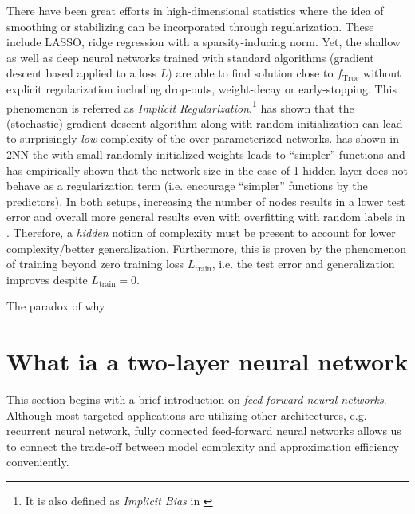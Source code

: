 There have been great efforts in high-dimensional statistics where the idea
of smoothing or stabilizing can be incorporated through regularization. These
include LASSO, ridge regression with a sparsity-inducing norm. Yet, the shallow
as well as deep neural networks \cite{neyshaburSearchRealInductive2015,
maennelGradientDescentQuantizes2018, liLearningOverparameterizedNeural2019,
kuboImplicitRegularizationOverparameterized2019,
neyshaburImplicitRegularizationDeep2017} trained with standard algorithms
(gradient descent based applied to a loss $L$) are able to find solution close
to $f_{\text{True}}$ without explicit regularization including drop-outs,
weight-decay or early-stopping. This phenomenon is referred as \textit{Implicit
Regularization}.\footnote{ It is also defined as \textit{Implicit Bias} in
\cite{soudryImplicitBiasGradient2022} }
\cite{kuboImplicitRegularizationOverparameterized2019} has shown that the
(stochastic) gradient descent algorithm along with random initialization can
lead to surprisingly \textit{low} complexity of the over-parameterized networks.
\cite{maennelGradientDescentQuantizes2018} has shown in 2NN the with small
randomly initialized weights leads to ``simpler'' functions and
\cite{maennelGradientDescentQuantizes2018, neyshaburSearchRealInductive2015} has
empirically shown that the network size in the case of 1 hidden layer does not
behave as a regularization term (i.e. encourage ``simpler'' functions by the
predictors). In both setups, increasing the number of nodes results in a lower
test error and overall more general results even with overfitting with random
labels in \cite{neyshaburSearchRealInductive2015}. Therefore, a \textit{hidden}
notion of complexity must be present to account for lower complexity/better
generalization. Furthermore, this is proven by the phenomenon of training beyond
zero training loss \TOCITE $L_{\text{train}}$, i.e. the test error and
generalization improves despite $L_{\text{train}} = 0$.

The paradox of why 


\section{What ia a two-layer neural network}

This section begins with a brief introduction on \textit{feed-forward neural
networks}. Although most targeted applications are utilizing other architectures,
e.g. recurrent neural network, fully connected feed-forward neural
networks allows us to connect the trade-off between model complexity and
approximation efficiency conveniently.

